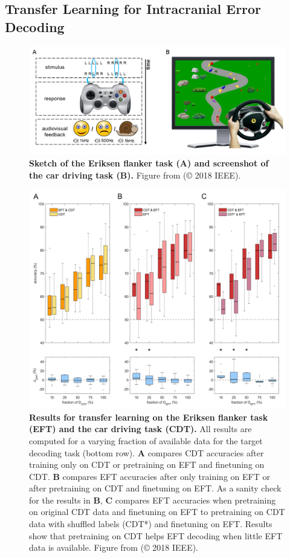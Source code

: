\subsection{Transfer Learning for Intracranial Error
Decoding}\label{transfer-learning-for-intracranial-error-decoding}

\begin{figure}[h!tb]
    \myfloatalign
    \includegraphics[width=0.7\linewidth]{images/eriksen-flanker-car-driving-tasks.png}
    \caption[Visualizations of Eriksen flanker and  car driving task]{
\textbf{Sketch of the Eriksen flanker task (A) and screenshot of the car
driving task (B).} Figure from \citet{behncke2018cross} (© 2018 IEEE). 
}
\label{eriksen-flanker-car-driving-tasks-fig}
\end{figure}


\begin{figure}[h!tb]
    \myfloatalign
    \includegraphics[width=0.8\linewidth]{images/cross-training-eft-cdt-results.png}
    \caption[Results for transfer learning on the Eriksen flanker task and the car driving task]{
\textbf{Results for transfer learning on the Eriksen flanker task (EFT)
and the car driving task (CDT).} All results are computed for a varying
fraction of available data for the target decoding task (bottom row).
\textbf{A} compares CDT accuracies after training only on CDT or
pretraining on EFT and finetuning on CDT. \textbf{B} compares EFT
accuracies after only training on EFT or after pretraining on CDT and
finetuning on EFT. As a sanity check for the results in \textbf{B},
\textbf{C} compares EFT accuracies when pretraining on original CDT data
and finetuning on EFT to pretraining on CDT data with shuffled labels
(CDT*) and finetuning on EFT. Results show that pretraining on CDT helps
EFT decoding when little EFT data is available. Figure from
\citet{behncke2018cross} (© 2018 IEEE).
}
\label{cross-training-eft-cdt-results-fig}
\end{figure}


